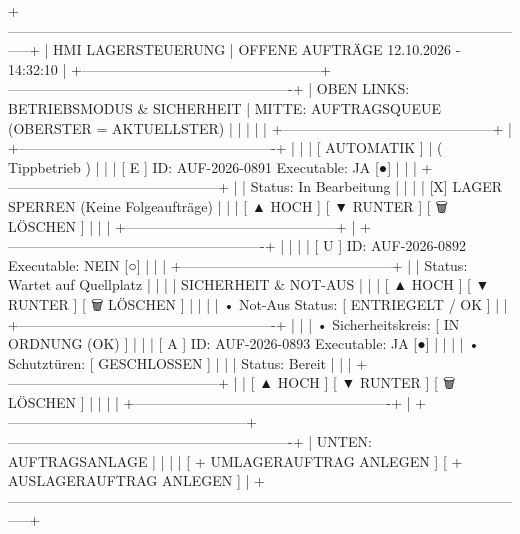 +-----------------------------------------------------------------------------------------------------------------+
|  HMI LAGERSTEUERUNG | OFFENE AUFTRÄGE                                                12.10.2026 - 14:32:10      |
+---------------------------------------------------+-------------------------------------------------------------+
| OBEN LINKS: BETRIEBSMODUS & SICHERHEIT            | MITTE: AUFTRAGSQUEUE (OBERSTER = AKTUELLSTER)               |
|                                                   |                                                             |
|  +---------------------------------------------+  |  +-------------------------------------------------------+  |
|  | [  AUTOMATIK  ]  |  ( Tippbetrieb )         |  |  | [ E ]  ID: AUF-2026-0891     Executable: JA [●]   |  |
|  +---------------------------------------------+  |  |        Status: In Bearbeitung                        |  |
|  | [X] LAGER SPERREN (Keine Folgeaufträge)     |  |  |        [ ▲ HOCH ]  [ ▼ RUNTER ]  [ 🗑 LÖSCHEN ]       |  |
|  +---------------------------------------------+  |  +-------------------------------------------------------+  |
|                                                   |  | [ U ]  ID: AUF-2026-0892     Executable: NEIN [○] |  |
|  +---------------------------------------------+  |  |        Status: Wartet auf Quellplatz                 |  |
|  | SICHERHEIT & NOT-AUS                        |  |  |        [ ▲ HOCH ]  [ ▼ RUNTER ]  [ 🗑 LÖSCHEN ]       |  |
|  | • Not-Aus Status:   [ ENTRIEGELT / OK  ]    |  |  +-------------------------------------------------------+  |
|  | • Sicherheitskreis: [ IN ORDNUNG (OK)  ]    |  |  | [ A ]  ID: AUF-2026-0893     Executable: JA [●]   |  |
|  | • Schutztüren:      [ GESCHLOSSEN      ]    |  |  |        Status: Bereit                                |  |
|  +---------------------------------------------+  |  |        [ ▲ HOCH ]  [ ▼ RUNTER ]  [ 🗑 LÖSCHEN ]       |  |
|                                                   |  +-------------------------------------------------------+  |
+---------------------------------------------------+-------------------------------------------------------------+
| UNTEN: AUFTRAGSANLAGE                                                                                           |
|                                                                                                                 |
|  [ + UMLAGERAUFTRAG ANLEGEN ]                              [ + AUSLAGERAUFTRAG ANLEGEN ]                         |
+-----------------------------------------------------------------------------------------------------------------+





